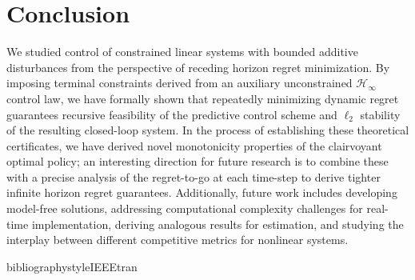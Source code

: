 \documentclass[conference]{IEEEtran}
\begin{document}
\section{Conclusion}
\label{sec:conclusion}
We studied control of constrained linear systems with bounded additive disturbances from the perspective of receding horizon regret minimization. By imposing terminal constraints derived from an auxiliary unconstrained $\mathcal{H}_\infty$ control law, we have formally shown that repeatedly minimizing dynamic regret guarantees recursive feasibility of the predictive control scheme and $\ell_2$ stability of the resulting closed-loop system. In the process of establishing these theoretical certificates, we have derived novel monotonicity properties of the clairvoyant optimal policy; an interesting direction for future research is to combine these with a precise analysis of the regret-to-go at each time-step to derive tighter infinite horizon regret guarantees. %
Additionally, future work includes developing model-free solutions, addressing computational complexity challenges for real-time implementation, deriving analogous results for estimation, and studying the interplay between different competitive metrics for nonlinear systems.

bibliographystyle{IEEEtran}


\appendix
\allowdisplaybreaks
\end{document}
